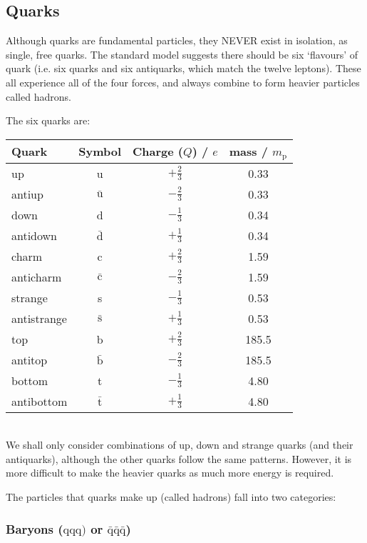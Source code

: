 \documentclass[a4paper,12pt]{article}
\begin{document}
\subsection{Quarks}
Although quarks are fundamental particles, they NEVER exist in isolation, as single, free quarks.  The standard model suggests there should be six `flavours' of quark (i.e. six quarks and six antiquarks, which match the twelve leptons).  These all experience all of the four forces, and always combine to form heavier particles called hadrons.

\newpage

The six quarks are:\\

\noindent\begin{tabular}{lccc}
\hline
\hline
Quark & Symbol & Charge ($Q$) / $e$ & mass / $m_{\mathrm{p}}$\\
\hline
up & u & $+\frac{2}{3}$ & 0.33\\
antiup & $\bar{\mathrm{u}}$ & $-\frac{2}{3}$ & 0.33\\ 
down & d & $-\frac{1}{3}$ & 0.34\\
antidown & $\bar{\mathrm{d}}$ & $+\frac{1}{3}$ & 0.34\\
\hline
charm & c & $+\frac{2}{3}$ & 1.59\\
anticharm & $\bar{\mathrm{c}}$ & $-\frac{2}{3}$ & 1.59\\
strange & s & $-\frac{1}{3}$ & 0.53\\
antistrange & $\bar{\mathrm{s}}$ & $+\frac{1}{3}$ & 0.53\\
\hline
top & b & $+\frac{2}{3}$ & 185.5\\
antitop & $\bar{\mathrm{b}}$ & $-\frac{2}{3}$ & 185.5\\
bottom & t & $-\frac{1}{3}$ & 4.80\\
antibottom & $\bar{\mathrm{t}}$ & $+\frac{1}{3}$ & 4.80\\
\hline
\hline
\end{tabular}\\

We shall only consider combinations of up, down and strange quarks (and their antiquarks), although the other quarks follow the same patterns.  However, it is more difficult to make the heavier quarks as much more energy is required.

The particles that quarks make up (called hadrons) fall into two categories:

\subsubsection{Baryons ($\mathrm{q}\mathrm{q}\mathrm{q})$ or $\bar{\mathrm{q}}\bar{\mathrm{q}}\bar{\mathrm{q}}$)}
\end{document}
